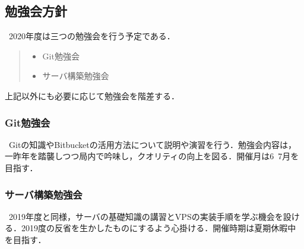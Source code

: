 \subsection*{勉強会方針}


\ 2020年度は三つの勉強会を行う予定である．
\begin{quote}
 \begin{itemize}
\item Git勉強会
\item サーバ構築勉強会
 \end{itemize}
\end{quote}
上記以外にも必要に応じて勉強会を階差する．

\subsubsection*{Git勉強会}
\ Gitの知識やBitbucketの活用方法について説明や演習を行う．勉強会内容は，一昨年を踏襲しつつ局内で吟味し，クオリティの向上を図る．開催月は6~7月を目指す．
\subsubsection*{サーバ構築勉強会}
\ 2019年度と同様，サーバの基礎知識の講習とVPSの実装手順を学ぶ機会を設ける．2019度の反省を生かしたものにするよう心掛ける．開催時期は夏期休暇中を目指す．


